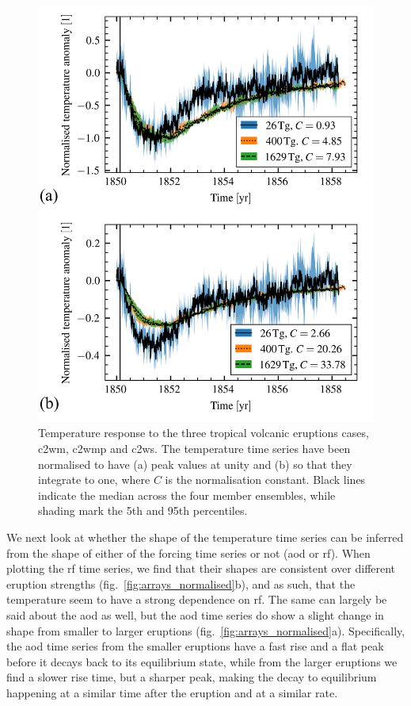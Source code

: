 \documentclass{ametsocV6.1}
\begin{document}
\begin{figure}
  \centering
  \includegraphics[width=0.95\linewidth]{figures/compare-waveform.png}

  \caption{Temperature response to the three tropical volcanic eruptions cases,
    \gls{c2wm}, \gls{c2wmp} and \gls{c2ws}. The temperature time series have been normalised
    to have (a) peak values at unity and (b) so that they integrate to one, where \(C\) is
    the normalisation constant. Black lines indicate the median across the four member
    ensembles, while shading mark the 5th and 95th percentiles.}\label{fig:compare-waveform}%
\end{figure}

We next look at whether the shape of the temperature time series can be inferred from
the shape of either of the forcing time series or not (\gls{aod} or \gls{rf}). When
plotting the \gls{rf} time series, we find that their shapes are consistent over
different eruption strengths (fig.~\ref{fig:arrays_normalised}b), and as such, that the
temperature seem to have a strong dependence on \gls{rf}. The same can largely be said
about the \gls{aod} as well, but the \gls{aod} time series do show a slight change in
shape from smaller to larger eruptions (fig.~\ref{fig:arrays_normalised}a).
Specifically, the \gls{aod} time series from the smaller eruptions have a fast rise and
a flat peak before it decays back to its equilibrium state, while from the larger
eruptions we find a slower rise time, but a sharper peak, making the decay to
equilibrium happening at a similar time after the eruption and at a similar rate.
\end{document}
